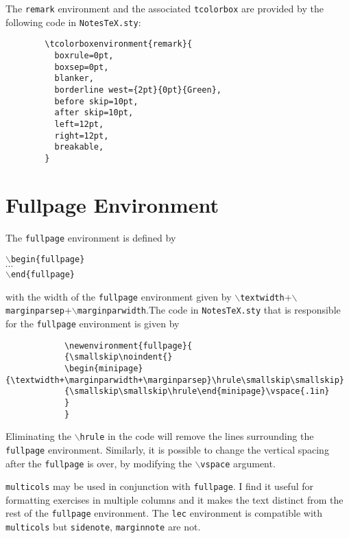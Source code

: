 \documentclass[10pt]{article}
\begin{document}
\begin{remark}
	The \texttt{remark} environment and the associated \texttt{tcolorbox} are provided by the following code in \texttt{NotesTeX.sty}:
	\begin{verbatim}
		\tcolorboxenvironment{remark}{
		  boxrule=0pt,
		  boxsep=0pt,
		  blanker,
		  borderline west={2pt}{0pt}{Green},
		  before skip=10pt,
		  after skip=10pt,
		  left=12pt,
		  right=12pt,
		  breakable,
		}
		\end{verbatim}
\end{remark}

\section{Fullpage Environment}\label{Sec: Fullpage}
\begin{fullpage}
	The \texttt{fullpage} environment is defined by
	\begin{center}
		\texttt{\( \backslash \)begin\{fullpage\}}\\
		\( \cdots \)\\
		\texttt{\( \backslash \)end\{fullpage\}}
	\end{center}
	with the width of the \texttt{fullpage} environment given by \texttt{\( \backslash \)textwidth}+\texttt{\( \backslash \)marginparsep}+\texttt{\( \backslash \)marginparwidth}.The code in \texttt{NotesTeX.sty} that is responsible for the \texttt{fullpage} environment is given by
	\begin{verbatim}
			\newenvironment{fullpage}{
			{\smallskip\noindent{}
			\begin{minipage}{\textwidth+\marginparwidth+\marginparsep}\hrule\smallskip\smallskip}
			{\smallskip\smallskip\hrule\end{minipage}\vspace{.1in}
			}
			}
			\end{verbatim}
\end{fullpage}
\begin{remark}
	Eliminating the \texttt{\( \backslash \)hrule} in the code will remove the lines surrounding the \texttt{fullpage} environment. Similarly, it is possible to change the vertical spacing after the \texttt{fullpage} is over, by modifying the \texttt{\( \backslash \)vspace\textbraceleft\textbraceright} argument.
\end{remark}

\begin{fullpage}
	\begin{multicols}{2}
		\texttt{multicols}  may be used in conjunction with \texttt{fullpage}. I find it useful for formatting exercises in multiple columns and it makes the text distinct from the rest of the \texttt{fullpage} environment. The \texttt{lec} environment is compatible with \texttt{multicols} but \texttt{sidenote}, \texttt{marginnote} are not.\\

	\end{multicols}
\end{fullpage}
\end{document}
